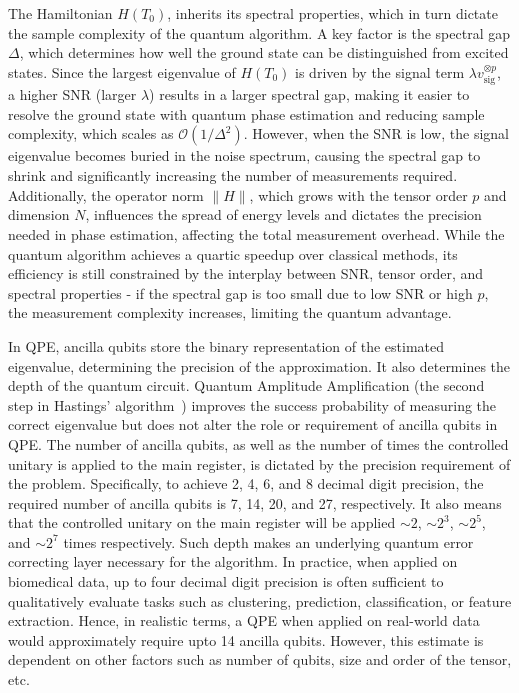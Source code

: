The Hamiltonian $H(T_0)$, inherits its spectral properties, which in turn dictate the sample complexity of the quantum algorithm. A key factor is the spectral gap $\Delta$, which determines how well the ground state can be distinguished from excited states. Since the largest eigenvalue of $H(T_0)$ is driven by the signal term $\lambda v_{\text{sig}}^{\otimes p}$, a higher SNR (larger $\lambda$) results in a larger spectral gap, making it easier to resolve the ground state with quantum phase estimation and reducing sample complexity, which scales as $\mathcal{O}(1/\Delta^2)$. However, when the SNR is low, the signal eigenvalue becomes buried in the noise spectrum, causing the spectral gap to shrink and significantly increasing the number of measurements required. Additionally, the operator norm $\|\hat{H}\|$, which grows with the tensor order $p$ and dimension $N$, influences the spread of energy levels and dictates the precision needed in phase estimation, affecting the total measurement overhead. While the quantum algorithm achieves a quartic speedup over classical methods, its efficiency is still constrained by the interplay between SNR, tensor order, and spectral properties - if the spectral gap is too small due to low SNR or high $p$, the measurement complexity increases, limiting the quantum advantage.

In QPE, ancilla qubits store the binary representation of the estimated eigenvalue, determining the precision of the approximation. It also determines the depth of the quantum circuit. Quantum Amplitude Amplification (the second step in Hastings' algorithm~\cite{hastings2020classical}) improves the success probability of measuring the correct eigenvalue but does not alter the role or requirement of ancilla qubits in QPE. The number of ancilla qubits, as well as the number of times the controlled unitary is applied to the main register, is dictated by the precision requirement of the problem. Specifically, to achieve 2, 4, 6, and 8 decimal digit precision, the required number of ancilla qubits is 7, 14, 20, and 27, respectively. It also means that the controlled unitary on the main register will be applied $\sim 2$, $\sim2^3$, $\sim 2^5$, and $\sim 2^7$  times respectively. Such depth makes an underlying quantum error correcting layer necessary for the algorithm. In practice, when applied on biomedical data, up to four decimal digit precision is often sufficient to qualitatively evaluate tasks such as clustering, prediction, classification, or feature extraction. Hence, in realistic terms, a QPE when applied on real-world data would approximately require upto 14 ancilla qubits. However, this estimate is dependent on other factors such as number of qubits, size and order of the tensor, etc.


